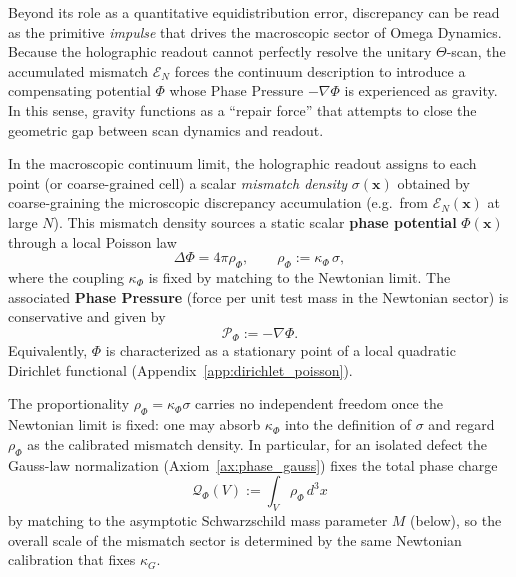 \begin{remark}
Beyond its role as a quantitative equidistribution error, discrepancy can be read as the primitive \emph{impulse} that drives the macroscopic sector of Omega Dynamics. Because the holographic readout cannot perfectly resolve the unitary $\Theta$-scan, the accumulated mismatch $\mathcal{E}_N$ forces the continuum description to introduce a compensating potential $\Phi$ whose Phase Pressure $-\nabla\Phi$ is experienced as gravity. In this sense, gravity functions as a ``repair force'' that attempts to close the geometric gap between scan dynamics and readout.
\end{remark}

\begin{assumption}
\label{assump:mismatch_potential}
In the macroscopic continuum limit, the holographic readout assigns to each point (or coarse-grained cell) a scalar \emph{mismatch density} $\sigma(\mathbf{x})$ obtained by coarse-graining the microscopic discrepancy accumulation (e.g.\ from $\mathcal{E}_N(\mathbf{x})$ at large $N$).
This mismatch density sources a static scalar \textbf{phase potential} $\Phi(\mathbf{x})$ through a local Poisson law
\begin{equation}
  \Delta \Phi = 4\pi \rho_\Phi,\qquad \rho_\Phi := \kappa_\Phi\,\sigma,
\end{equation}
where the coupling $\kappa_\Phi$ is fixed by matching to the Newtonian limit. The associated \textbf{Phase Pressure} (force per unit test mass in the Newtonian sector) is conservative and given by
\begin{equation}
  \mathcal{P}_\Phi := -\nabla \Phi.
\end{equation}
Equivalently, $\Phi$ is characterized as a stationary point of a local quadratic Dirichlet functional (Appendix~\ref{app:dirichlet_poisson}).
\end{assumption}

\begin{remark}
The proportionality $\rho_\Phi=\kappa_\Phi\sigma$ carries no independent freedom once the Newtonian limit is fixed: one may absorb $\kappa_\Phi$ into the definition of $\sigma$ and regard $\rho_\Phi$ as the calibrated mismatch density. In particular, for an isolated defect the Gauss-law normalization (Axiom~\ref{ax:phase_gauss}) fixes the total phase charge
\begin{equation}
  \mathcal{Q}_\Phi(V):=\int_V \rho_\Phi\,d^3x
\end{equation}
by matching to the asymptotic Schwarzschild mass parameter $M$ (below), so the overall scale of the mismatch sector is determined by the same Newtonian calibration that fixes $\kappa_G$.
\end{remark}

